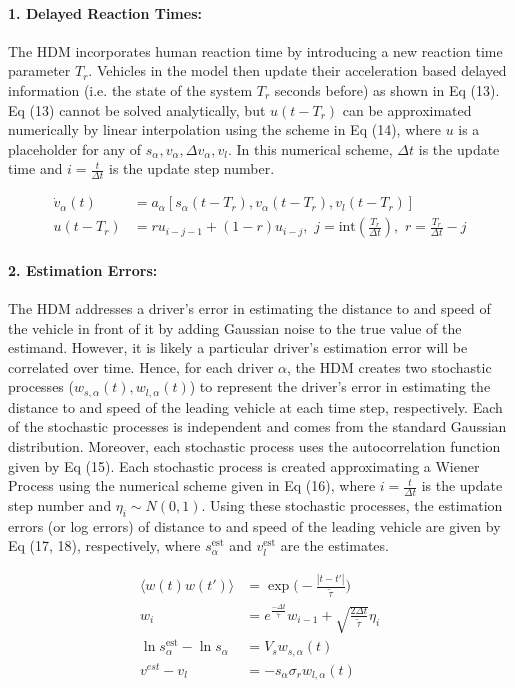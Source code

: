 \documentclass[12pt]{article}
\begin{document}
\paragraph{1. Delayed Reaction Times:}
The HDM incorporates human reaction time by introducing a new reaction time parameter $T_r$.  Vehicles in the model then update their acceleration based delayed information (i.e. the state of the system $T_r$ seconds before) as shown in Eq (13). Eq (13) cannot be solved analytically, but $u(t-T_r)$ can be approximated numerically by linear interpolation using the scheme in Eq (14), where $u$ is a placeholder for any of $s_\alpha,v_\alpha,\Delta v_\alpha,v_l$.  In this numerical scheme, $\Delta t$ is the update time and $i=\frac{t}{\Delta t}$ is the update step number.
\begin{mymathbox}[ams gather, title=Delayed Reaction Time Equations Equations,colframe=blue!30!black]
  \begin{align}
  \dot{v}_\alpha(t) &= a_{\alpha}\left[s_\alpha(t-T_r), v_\alpha(t-T_r), v_l(t-T_r) \right]\\
  u(t-T_r) &= ru_{i-j-1} + (1-r)u_{i-j},  \, \, j = \textrm{int}\left(\frac{T_r}{\Delta t} \right), \, \, r = \frac{T_r}{\Delta t} - j
  \end{align}
\end{mymathbox}
\paragraph{2. Estimation Errors:}
The HDM addresses a driver's error in estimating the distance to and speed of the vehicle in front of it by adding Gaussian noise to the true value of the estimand.  However, it is likely a particular driver's estimation error will be correlated over time. Hence, for each driver $\alpha$, the HDM creates two stochastic processes ($w_{s,\alpha}(t),w_{l,\alpha}(t)$) to represent the driver's error in estimating the distance to and speed of the leading vehicle at each time step, respectively.  Each of the stochastic processes is independent and comes from the standard Gaussian distribution.  Moreover, each stochastic process uses the autocorrelation function given by Eq (15).  Each stochastic process is created approximating a Wiener Process using the numerical scheme given in Eq (16), where $i=\frac{t}{\Delta t}$ is the update step number and $\eta_i \sim N(0,1)$.  Using these stochastic processes, the estimation errors (or log errors) of distance to and speed of the leading vehicle are given by Eq (17, 18), respectively, where $s_\alpha^\text{est}$ and $v_l^\text{est}$ are the estimates.
\begin{mymathbox}[ams gather, title=Estimation Error Equations,colframe=blue!30!black]
  \begin{align}
  \langle w(t)w(t')\rangle&  =\exp\bigg(-\frac{|t-t'|}{\tilde{\tau}}\bigg)\\
  w_i&=e^{\frac{-\Delta t}{\tilde{\tau}}}w_{i-1}+\sqrt{\frac{2\Delta t}{\tilde\tau}}\eta_i\\
  \ln s_\alpha^{\text{est}} - \ln s_\alpha &= V_s w_{s,\alpha}(t)\\
  v^{est} - v_l &= -s_\alpha \sigma_r w_{l,\alpha}(t)
  \end{align}
\end{mymathbox}
\end{document}
